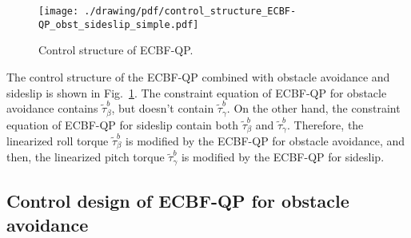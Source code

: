 \begin{figure}[t]
    \centering
    \texttt{[image: ./drawing/pdf/control\_structure\_ECBF-QP\_obst\_sideslip\_simple.pdf]}
    \caption{Control structure of ECBF-QP.}
    \label{fig:control_structure_of_ECBF-QP}
\end{figure}
The control structure of the ECBF-QP combined with obstacle avoidance and sideslip is shown in Fig.~\ref{fig:control_structure_of_ECBF-QP}.
The constraint equation of ECBF-QP for obstacle avoidance contains $ \tilde{\tau}_{\beta}^b $, but doesn't contain $ \tilde{\tau}_{\gamma}^b $.
On the other hand, the constraint equation of ECBF-QP for sideslip contain both $ \tilde{\tau}_{\beta}^b $ and $ \tilde{\tau}_{\gamma}^b $.
Therefore, the linearized roll torque $ \tilde{\tau}_{\beta}^b $ is modified by the ECBF-QP for obstacle avoidance, and then, the linearized pitch torque $ \tilde{\tau}_{\gamma}^b $ is modified by the ECBF-QP for sideslip.

\subsection{Control design of ECBF-QP for obstacle avoidance}
\label{subsec:obstQP_roll_torque}

